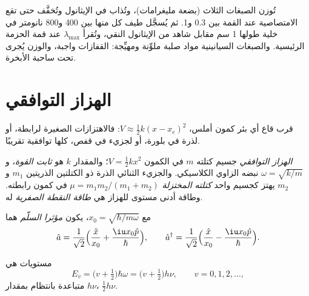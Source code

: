 \begin{inthelab}
تُوزن الصبغات الثلاث (بضعة مليغرامات)، وتُذاب في الإيثانول
وتُخفَّف حتى تقع الامتصاصية عند القمة بين 0.3 و1. ثم
يُسجَّل طيف كل منها بين 400 و800 نانومتر في خلية طولها 1 سم
مقابل شاهد من الإيثانول النقي، وتُقرأ $\lambda_{\max}$ عند قمة
الحزمة الرئيسية. والصبغات السيانينية مواد صلبة ملوِّنة ومهيِّجة: القفازات واجبة،
والوزن يُجرى تحت ساحبة الأبخرة.
\end{inthelab}

\section{الهزاز التوافقي}

قرب قاع أي بئر كمون أملس، $V \approx \frac12 k(x - x_e)^2$:
فالاهتزازات الصغيرة لرابطة، أو لذرة في بلورة، أو لجزيء في
قفص، كلها توافقية تقريبًا.

\begin{definition}\label{def:b3:quantum-model-systems:oscillator}
\emph{الهزاز التوافقي} جسيم
كتلته $m$ في الكمون $V = \frac12 kx^2$؛ والمقدار $k$ هو \emph{ثابت
القوة}، و$\omega = \sqrt{k/m}$ نبضه الزاوي
الكلاسيكي. والجزيء الثنائي الذرة ذو الكتلتين الذريتين $m_1$ و$m_2$
يهتز كجسيم واحد \emph{كتلته المختزلة}
$\mu = m_1m_2/(m_1 + m_2)$ في كمون رابطته. وطاقة
أدنى مستوى للهزاز هي \emph{طاقة النقطة الصفرية} له.
\end{definition}

\begin{definition}\label{def:b3:quantum-model-systems:ladder}
مع $x_0 = \sqrt{\hbar/m\omega}$، يكون \emph{مؤثرا السلّم}
هما
\[
\hat a = \frac{1}{\sqrt2}\Big(\frac{\hat x}{x_0} + \frac{\iu x_0\hat p}{\hbar}\Big),
\qquad \hat a^\dagger = \frac{1}{\sqrt2}\Big(\frac{\hat x}{x_0} -
\frac{\iu x_0\hat p}{\hbar}\Big).
\]
\end{definition}

\begin{theorem}\label{thm:b3:quantum-model-systems:oscillator}
مستويات  هي
\[
E_v = \big(v + \tfrac12\big)\hbar\omega = \big(v + \tfrac12\big)h\nu, \qquad v =
0, 1, 2, \dots,
\]
متباعدة بانتظام بمقدار $h\nu$،  $\frac12h\nu$.
\end{theorem}

